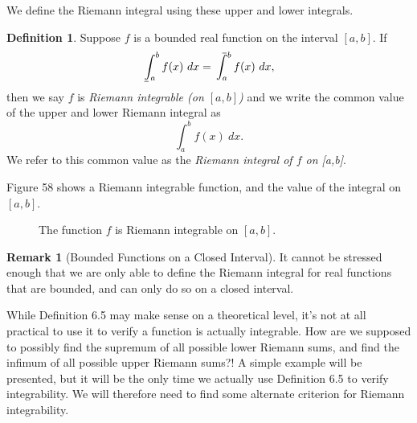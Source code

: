 \documentclass{article}
\def\upint{\mathchoice%
	{\mkern13mu\overline{\vphantom{\intop}\mkern7mu}\mkern-20mu}%
	{\mkern7mu\overline{\vphantom{\intop}\mkern7mu}\mkern-14mu}%
	{\mkern7mu\overline{\vphantom{\intop}\mkern7mu}\mkern-14mu}%
	{\mkern7mu\overline{\vphantom{\intop}\mkern7mu}\mkern-14mu}%
	\int}
\def\lowint{\mkern3mu\underline{\vphantom{\intop}\mkern7mu}\mkern-10mu\int}
\newcommand{\R}{\mathbb{R}}
\theoremstyle{definition}
\newtheorem{definition}{Definition}[section]
\newtheorem{remark}{Remark}[section]
\begin{document}
We define the Riemann integral using these upper and lower integrals.
\begin{definition}
	Suppose $ f $ is a bounded real function  on the interval $ [a,b] $. If $$ \lowint_a^b f(x)\ dx=\upint_a^b f(x)\ dx,$$ then we say $ f $ is \textit{\color{red}Riemann integrable (on $ [a,b] $)} and we write the common value of the upper and lower Riemann integral as $$ \int_{a}^{b}f(x)\ dx.$$ We refer to this common value as the \textit{\color{red}Riemann integral of $ f $ on [a,b]}. 
\end{definition}
Figure 58 shows a Riemann integrable function, and the value of the integral on $ [a,b] $. 
\begin{figure}[h!]
	\centering
	\caption{ The function $ f $ is Riemann integrable on $ [a,b] $.}
\end{figure}
\begin{remark}[Bounded Functions on a Closed Interval]
	It cannot be stressed enough that we are only able to define the Riemann integral for real functions that are bounded, and can only do so on a closed interval.
\end{remark}
While Definition 6.5 may make sense on a theoretical level, it's not at all practical to use it to verify a function is actually integrable. How are we supposed to possibly find the supremum of all possible lower Riemann sums, and find the infimum of all possible upper Riemann sums?! A simple example will be presented, but it will be the only time we actually use Definition 6.5 to verify integrability. We will therefore need to find some alternate criterion for Riemann integrability.    
\end{document}
